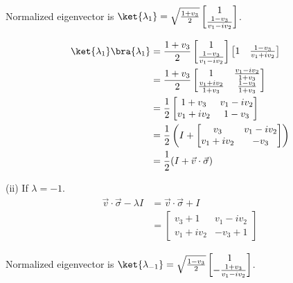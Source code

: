 \documentclass[a4paper,12pt]{article}
\begin{document}
Normalized eigenvector is $\ket{\lambda_1} = \sqrt{ \frac{1+v_3}{2 }} \begin{bmatrix}
1 \\
\frac{1-v_3}{v_1 - iv_2}
\end{bmatrix} $.

\begin{align*}
	\ket{\lambda_1}\bra{\lambda_1} &= \frac{1+v_3}{2 } \begin{bmatrix}
		1 \\
		\frac{1-v_3}{v_1 - iv_2}
	\end{bmatrix}
	\begin{bmatrix}
   		1 &
   		\frac{1-v_3}{v_1 + iv_2}
	\end{bmatrix}\\
%
	&=
	 \frac{1+v_3}{2 } \begin{bmatrix}
    	 1 & \frac{v_1 - iv_2}{1 + v_3} \\
    	 \frac{v_1 + iv_2}{1 + v_3} & \frac{1-v_3}{1+v_3}
	 \end{bmatrix} \\
	 &=
	 \frac{1}{2} \begin{bmatrix}
    	 1+v_3 & v_1 - iv_2 \\
    	 v_1 + iv_2 & 1 - v_3
	 \end{bmatrix} \\
	 &=
	  \frac{1}{2} \left( I + \begin{bmatrix}
    	 v_3 & v_1 - iv_2 \\
    	 v_1 + iv_2 & - v_3
	 \end{bmatrix} \right) \\
	 &=
	 \frac{1}{2} (I + \vec{v} \cdot \vec{\sigma} )
\end{align*}



(ii) If $\lambda = -1$.
\begin{align*}
	\vec{v} \cdot \vec{\sigma}  - \lambda I &= \vec{v} \cdot \vec{\sigma}  + I\\
	&= \begin{bmatrix}
		v_3 + 1 & v_1 - i v_2 \\
		v_1 + i v_2 & - v_3 + 1
	\end{bmatrix}
\end{align*}

Normalized eigenvector is $\ket{\lambda_{-1}} = \sqrt{ \frac{1-v_3}{2 }} \begin{bmatrix}
    1 \\
    - \frac{1+v_3}{v_1 - iv_2}
\end{bmatrix} $.
\end{document}
